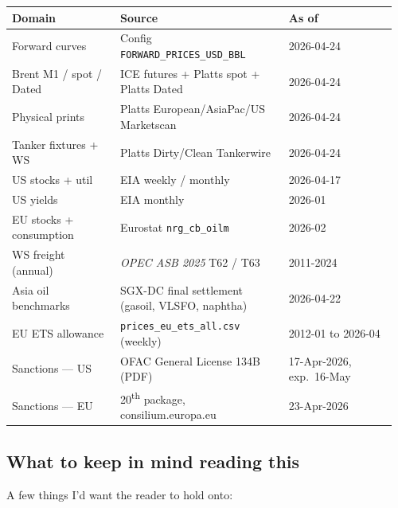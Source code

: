 \documentclass[10pt,a4paper]{article}
\begin{document}
\small
\begin{tabular}{@{}p{0.27\linewidth} p{0.42\linewidth} p{0.27\linewidth}@{}}
\toprule
\textbf{Domain} & \textbf{Source} & \textbf{As of} \\
\midrule
Forward curves        & Config \texttt{FORWARD\_PRICES\_USD\_BBL} & 2026-04-24 \\
Brent M1 / spot / Dated & ICE futures + Platts spot + Platts Dated & 2026-04-24 \\
Physical prints       & Platts European/AsiaPac/US Marketscan & 2026-04-24 \\
Tanker fixtures + WS  & Platts Dirty/Clean Tankerwire & 2026-04-24 \\
US stocks + util      & EIA weekly / monthly & 2026-04-17 \\
US yields             & EIA monthly & 2026-01 \\
EU stocks + consumption & Eurostat \texttt{nrg\_cb\_oilm} & 2026-02 \\
WS freight (annual)   & \emph{OPEC ASB 2025} T62 / T63 & 2011-2024 \\
Asia oil benchmarks   & SGX-DC final settlement (gasoil, VLSFO, naphtha) & 2026-04-22 \\
EU ETS allowance      & \texttt{prices\_eu\_ets\_all.csv} (weekly) & 2012-01 to 2026-04 \\
Sanctions --- US      & OFAC General License 134B (PDF) & 17-Apr-2026, exp.\ 16-May \\
Sanctions --- EU      & 20\textsuperscript{th} package, consilium.europa.eu & 23-Apr-2026 \\
\bottomrule
\end{tabular}

\subsection{What to keep in mind reading this}

A few things I'd want the reader to hold onto:
\end{document}
